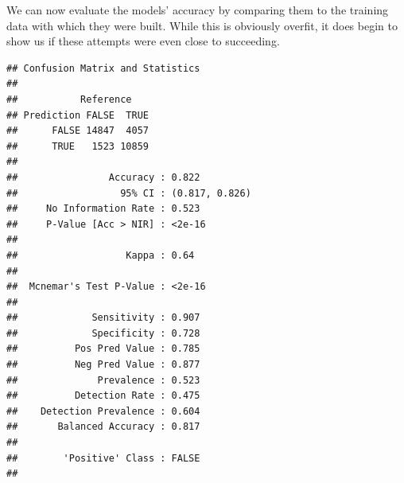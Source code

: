 \documentclass[
]{article}
\newenvironment{Shaded}{\begin{snugshade}}{\end{snugshade}}
\newcommand{\AttributeTok}[1]{\textcolor[rgb]{0.77,0.63,0.00}{#1}}
\newcommand{\CommentTok}[1]{\textcolor[rgb]{0.56,0.35,0.01}{\textit{#1}}}
\newcommand{\DocumentationTok}[1]{\textcolor[rgb]{0.56,0.35,0.01}{\textbf{\textit{#1}}}}
\newcommand{\FunctionTok}[1]{\textcolor[rgb]{0.00,0.00,0.00}{#1}}
\newcommand{\NormalTok}[1]{#1}
\newcommand{\OtherTok}[1]{\textcolor[rgb]{0.56,0.35,0.01}{#1}}
\newcommand{\SpecialCharTok}[1]{\textcolor[rgb]{0.00,0.00,0.00}{#1}}
\newcommand{\StringTok}[1]{\textcolor[rgb]{0.31,0.60,0.02}{#1}}
\begin{document}
\begin{Shaded}
\end{Shaded}

We can now evaluate the models' accuracy by comparing them to the
training data with which they were built. While this is obviously
overfit, it does begin to show us if these attempts were even close to
succeeding.

\begin{Shaded}
\end{Shaded}

\begin{verbatim}
## Confusion Matrix and Statistics
## 
##           Reference
## Prediction FALSE  TRUE
##      FALSE 14847  4057
##      TRUE   1523 10859
##                                         
##                Accuracy : 0.822         
##                  95% CI : (0.817, 0.826)
##     No Information Rate : 0.523         
##     P-Value [Acc > NIR] : <2e-16        
##                                         
##                   Kappa : 0.64          
##                                         
##  Mcnemar's Test P-Value : <2e-16        
##                                         
##             Sensitivity : 0.907         
##             Specificity : 0.728         
##          Pos Pred Value : 0.785         
##          Neg Pred Value : 0.877         
##              Prevalence : 0.523         
##          Detection Rate : 0.475         
##    Detection Prevalence : 0.604         
##       Balanced Accuracy : 0.817         
##                                         
##        'Positive' Class : FALSE         
## 
\end{verbatim}
\end{document}
